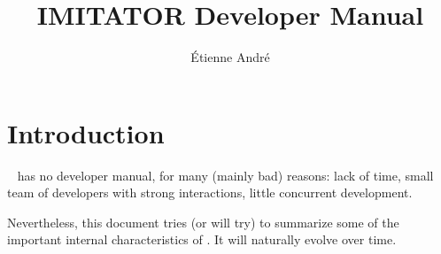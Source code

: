 
\newcommand{\titleOnHeader}{\textsf{IMITATOR} \emph{not} a Developer Manual}

\newcommand{\titleOnFirstPage}{IMITATOR \emph{not} a Developer Manual}




\title{IMITATOR Developer Manual}
\author{Étienne André}
	










\chapter{Introduction}

\imitator{}~\cite{Andre21} has no developer manual, for many (mainly bad) reasons:
lack of time, small team of developers with strong interactions, little concurrent development.

Nevertheless, this document tries (or will try) to summarize some of the important internal characteristics of \imitator{}.
It will naturally evolve over time.


